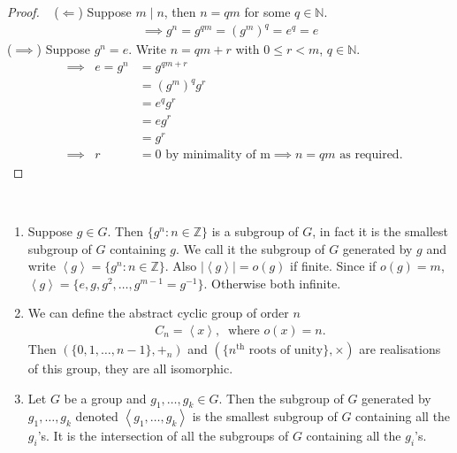 \begin{proof} ~
($\Longleftarrow$) Suppose $m \mid n$, then $n = qm$ for some $q \in \mathbb{N}$.
\begin{align*}
    \implies g^n = g^{qm} = (g^m)^q = e^q = e
\end{align*}
($\implies$) Suppose $g^n = e$. Write $n = qm + r$ with $0 \leq r < m$, $q \in \mathbb{N}$.
\begin{align*}
    &\implies & e = g^n &= g^{qm + r} \\
    && &= (g^m)^q g^r \\
    && &= e^q g^r \\
    && &= e g^r \\
    && &= g^r \\
    &\implies & r &= 0 \text{ by minimality of m} \implies n = qm \text{ as required.} 
\end{align*}
\end{proof}

\begin{remark} ~
\begin{enumerate}
\def\labelenumi{\roman{enumi}.}
\item
  Suppose $g \in G$. Then $\{ g^n : n \in \mathbb{Z} \}$ is a subgroup of $G$, in fact it is the smallest subgroup of $G$ containing $g$.
  We call it the subgroup of $G$ generated by $g$ and write $\left\langle g \right\rangle = \{ g^n : n \in \mathbb{Z} \}$. Also $|\left\langle g \right\rangle| = o(g)$ if finite.
  Since if $o(g) = m$, $\left\langle g \right\rangle = \{ e, g, g^2, \dots, g^{m-1} = g^{-1 }\}$.
  Otherwise both infinite.
\item
  We can define the abstract cyclic group of order $n$
  \begin{align*}
  C_n = \left\langle x \right\rangle,\ \text{ where } o(x) = n.
  \end{align*}
  Then $( \{ 0, 1, \dots, n-1 \}, +_n)$ and $( \{ n^{\text{th}} \text{ roots of unity}\}, \times)$ are realisations of this group, they are all isomorphic.
\item
  Let $G$ be a group and $g_1, \dots, g_k \in G$. Then the subgroup of $G$ generated by $g_1, \dots, g_k$ denoted $\left\langle g_1, \dots, g_k \right\rangle$ is the smallest subgroup of $G$ containing all the $g_i$'s. It is the intersection of all the subgroups of $G$ containing all the $g_i$'s.
\end{enumerate}

\end{remark}